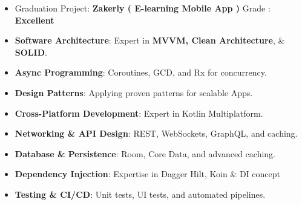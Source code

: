 \documentclass[10pt,a4paper,ragged2e,withhyper]{altacv}
\begin{document}
\begin{paracol}{2}








\switchcolumn


\normalsize\begin{itemize}
\item Graduation Project: \textbf{Zakerly ( E-learning Mobile App )} Grade : \textbf{Excellent}
\end{itemize}


{\normalsize\begin{itemize}

\item \textbf{Software Architecture}: Expert in \textbf{MVVM, Clean Architecture}, \& \textbf{SOLID}.
\item \textbf{Async Programming}: Coroutines, GCD, and Rx for concurrency.
\item \textbf{Design Patterns}: Applying proven patterns for scalable Apps.
\item \textbf{Cross-Platform Development}: Expert in Kotlin Multiplatform.
\item \textbf{Networking \& API Design}: REST, WebSockets, GraphQL, and caching.
\item \textbf{Database \& Persistence}: Room, Core Data, and advanced caching.
\item \textbf{Dependency Injection}: Expertise in Dagger Hilt, Koin \& DI concept
\item \textbf{Testing \& CI/CD}: Unit tests, UI tests, and automated pipelines.

\end{itemize}}



\end{paracol}
\end{document}

